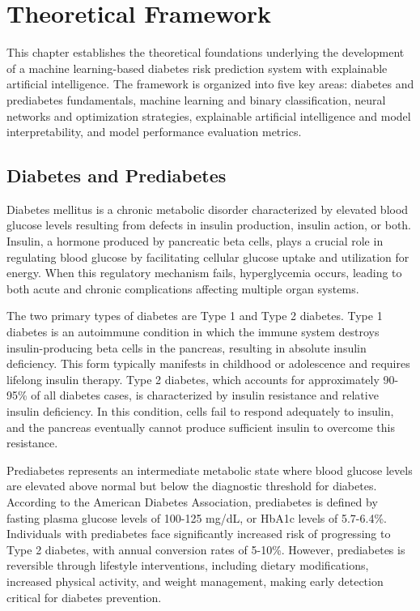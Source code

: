 \section{Theoretical Framework}

This chapter establishes the theoretical foundations underlying the development of a machine learning-based diabetes risk prediction system with explainable artificial intelligence. The framework is organized into five key areas: diabetes and prediabetes fundamentals, machine learning and binary classification, neural networks and optimization strategies, explainable artificial intelligence and model interpretability, and model performance evaluation metrics.

\subsection{Diabetes and Prediabetes}

Diabetes mellitus is a chronic metabolic disorder characterized by elevated blood glucose levels resulting from defects in insulin production, insulin action, or both. Insulin, a hormone produced by pancreatic beta cells, plays a crucial role in regulating blood glucose by facilitating cellular glucose uptake and utilization for energy. When this regulatory mechanism fails, hyperglycemia occurs, leading to both acute and chronic complications affecting multiple organ systems.

The two primary types of diabetes are Type 1 and Type 2 diabetes. Type 1 diabetes is an autoimmune condition in which the immune system destroys insulin-producing beta cells in the pancreas, resulting in absolute insulin deficiency. This form typically manifests in childhood or adolescence and requires lifelong insulin therapy. Type 2 diabetes, which accounts for approximately 90-95\% of all diabetes cases, is characterized by insulin resistance and relative insulin deficiency. In this condition, cells fail to respond adequately to insulin, and the pancreas eventually cannot produce sufficient insulin to overcome this resistance.

Prediabetes represents an intermediate metabolic state where blood glucose levels are elevated above normal but below the diagnostic threshold for diabetes. According to the American Diabetes Association, prediabetes is defined by fasting plasma glucose levels of 100-125 mg/dL, or HbA1c levels of 5.7-6.4\%. Individuals with prediabetes face significantly increased risk of progressing to Type 2 diabetes, with annual conversion rates of 5-10\%. However, prediabetes is reversible through lifestyle interventions, including dietary modifications, increased physical activity, and weight management, making early detection critical for diabetes prevention.

